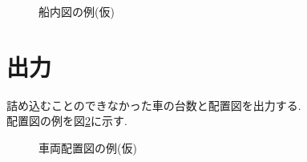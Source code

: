 \begin{figure}[htbp]
    \caption{船内図の例(仮)}
    \label{figure21}
\end{figure}

\section{出力}
詰め込むことのできなかった車の台数と配置図を出力する. \\
配置図の例を図\ref{figure22}に示す. 

\begin{figure}[htbp]
    \caption{車両配置図の例(仮)}
    \label{figure22}
\end{figure}


